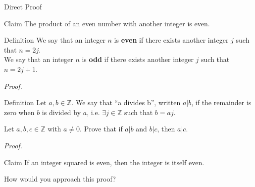 \documentclass [aspectratio=169]{beamer}
\newcommand{\Z}{{\mathbb{Z}}}
\begin{document}
\begin{frame}{Direct Proof}

\begin{exampleblock}{Claim}
The product of an even number with another integer is even.
\end{exampleblock}


\begin{alertblock}{Definition}
We say that an integer $n$ is {\bf even} if there exists another integer $j$ such that $n=2j$. \\
We say that an integer $n$ is {\bf odd} if there exists another integer $j$ such that $n=2j+1$.
\end{alertblock}

\textit{Proof.}

\vspace{6em}


\end{frame}

\begin{frame}
\begin{alertblock}{Definition}
Let $a,b \in \Z$. We say that ``a divides b'', written $a | b$, if the remainder is zero when $b$ is divided by $a$, i.e. $\exists j \in \Z$ such that $b = a j$.
\end{alertblock}


\begin{example}
Let $a,b,c \in \Z$ with $a \neq 0$. Prove that if $a | b$ and $b | c$, then $a | c$.
\end{example}
\textit{Proof.}
\vspace{6em}

\end{frame}



\begin{frame}{}
\begin{exampleblock}{Claim}
If an integer squared is even, then the integer is itself even.
\end{exampleblock}

\vspace{1em}

How would you approach this proof?

\end{frame}
\end{document}
